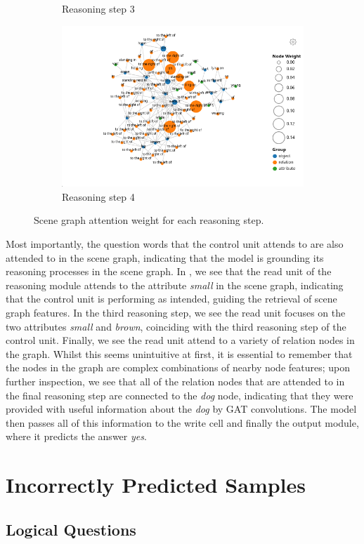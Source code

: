 \begin{figure}[htbp]
\begin{subfigure}[l]{0.49\textwidth}
        \caption{Reasoning step 3}
    \end{subfigure}
    \begin{subfigure}[r]{0.49\textwidth}
        \includegraphics[width=\textwidth]{figures/positive_logical/positive_logical_read_attn_3.png}
        \caption{Reasoning step 4}
    \end{subfigure}
    \caption[Scene graph attention weight for each reasoning step.]{Scene graph attention weight for each reasoning step.}
    \label{fig:positive_logical_read_attn}
\end{figure}

Most importantly, the question words that the control unit attends to are also attended to in the scene graph, indicating that the model is grounding its reasoning processes in the scene graph. In \figureautorefname{ \ref{fig:positive_logical_read_attn}}, we see that the read unit of the reasoning module attends to the attribute \textit{small} in the scene graph, indicating that the control unit is performing as intended, guiding the retrieval of scene graph features. In the third reasoning step, we see the read unit focuses on the two attributes \textit{small} and \textit{brown}, coinciding with the third reasoning step of the control unit. Finally, we see the read unit attend to a variety of relation nodes in the graph. Whilst this seems unintuitive at first, it is essential to remember that the nodes in the graph are complex combinations of nearby node features; upon further inspection, we see that all of the relation nodes that are attended to in the final reasoning step are connected to the \textit{dog} node, indicating that they were provided with useful information about the \textit{dog} by GAT convolutions. The model then passes all of this information to the write cell and finally the output module, where it predicts the answer \textit{yes}.

\section{Incorrectly Predicted Samples}



\subsection{Logical Questions}